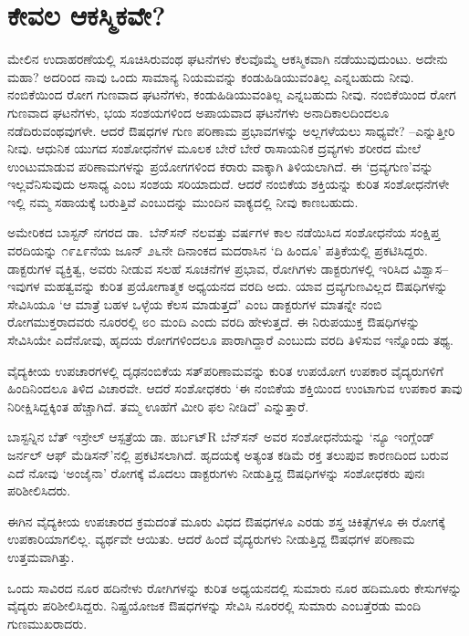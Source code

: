 \section*{ಕೇವಲ ಆಕಸ್ಮಿಕವೇ?}


ಮೇಲಿನ ಉದಾಹರಣೆಯಲ್ಲಿ ಸೂಚಿಸಿರುವಂಥ ಘಟನೆಗಳು ಕೆಲವೊಮ್ಮೆ ಆಕಸ್ಮಿಕವಾಗಿ ನಡೆಯುವುದುಂಟು. ಅದೇನು ಮಹಾ? ಅದರಿಂದ ನಾವು ಒಂದು ಸಾಮಾನ್ಯ ನಿಯಮವನ್ನು ಕಂಡು\-ಹಿಡಿಯು\-ವಂತಿಲ್ಲ ಎನ್ನಬಹುದು ನೀವು. ನಂಬಿಕೆಯಿಂದ ರೋಗ ಗುಣವಾದ ಘಟನೆಗಳು, ಕಂಡುಹಿಡಿಯುವಂತಿಲ್ಲ ಎನ್ನಬಹುದು ನೀವು. ನಂಬಿಕೆಯಿಂದ ರೋಗ ಗುಣವಾದ ಘಟನೆಗಳು, ಭಯ ಸಂಶಯಗಳಿಂದ ಅಪಾಯವಾದ ಘಟನೆಗಳು ಅನಾದಿಕಾಲದಿಂದಲೂ ನಡೆದಿರುವಂಥವುಗಳೇ. ಆದರೆ ಔಷಧಗಳ ಗುಣ ಪರಿಣಾಮ ಪ್ರಭಾವಗಳನ್ನು ಅಲ್ಲಗಳೆಯಲು ಸಾಧ್ಯವೇ? –ಎನ್ನುತ್ತೀರಿ ನೀವು. ಆಧುನಿಕ ಯುಗದ ಸಂಶೋಧನೆಗಳ ಮೂಲಕ ಬೇರೆ ಬೇರೆ ರಾಸಾಯನಿಕ ದ್ರವ್ಯಗಳು ಶರೀರದ ಮೇಲೆ ಉಂಟುಮಾಡುವ ಪರಿಣಾಮಗಳನ್ನು ಪ್ರಯೋಗಗಳಿಂದ ಕರಾರು ವಾಕ್ಕಾಗಿ ತಿಳಿಯಲಾಗಿದೆ. ಈ ‘ದ್ರವ್ಯಗುಣ’ವನ್ನು ಇಲ್ಲವೆನಿಸುವುದು ಅಸಾಧ್ಯ ಎಂಬ ಸಂಶಯ ಸರಿಯಾದುದೆ. ಆದರೆ ನಂಬಿಕೆಯ ಶಕ್ತಿಯನ್ನು ಕುರಿತ ಸಂಶೋಧನೆಗಳೇ ಇಲ್ಲಿ ನಮ್ಮ ಸಹಾಯಕ್ಕೆ ಬರುತ್ತಿವೆ ಎಂಬುದನ್ನು ಮುಂದಿನ ವಾಕ್ಯದಲ್ಲಿ ನೀವು ಕಾಣಬಹುದು.

ಅಮೇರಿಕದ ಬಾಸ್ಟನ್ ನಗರದ ಡಾ.\ ಬೆನ್​ಸನ್ ನಲವತ್ತು ವರ್ಷಗಳ ಕಾಲ ನಡೆಯಿಸಿದ ಸಂಶೋಧನೆಯ ಸಂಕ್ಷಿಪ್ತ ವರದಿಯನ್ನು ೧೯೭೯ನೆಯ ಜೂನ್ ೨೬ನೇ ದಿನಾಂಕದ ಮದರಾಸಿನ ‘ದಿ ಹಿಂದೂ’ ಪತ್ರಿಕೆಯಲ್ಲಿ ಪ್ರಕಟಿಸಿದ್ದರು. ಡಾಕ್ಟರುಗಳ ವ್ಯಕ್ತಿತ್ವ, ಅವರು ನೀಡುವ ಸಲಹೆ ಸೂಚನೆಗಳ ಪ್ರಭಾವ, ರೋಗಿಗಳು ಡಾಕ್ಟರುಗಳಲ್ಲಿ ಇರಿಸಿದ ವಿಶ್ವಾಸ–ಇವುಗಳ ಮಹತ್ವವನ್ನು ಕುರಿತ ಪ್ರಯೋಗಾತ್ಮಕ ಅಧ್ಯಯನದ ವರದಿ ಅದು. ಯಾವ ದ್ರವ್ಯಗುಣವಿಲ್ಲದ ಔಷಧಿಗಳನ್ನು ಸೇವಿಸಿಯೂ ‘ಆ ಮಾತ್ರೆ ಬಹಳ ಒಳ್ಳೆಯ ಕೆಲಸ ಮಾಡುತ್ತದೆ’ ಎಂಬ ಡಾಕ್ಟರುಗಳ ಮಾತನ್ನೇ ನಂಬಿ ರೋಗಮುಕ್ತರಾದವರು ನೂರರಲ್ಲಿ ೮೦ ಮಂದಿ ಎಂದು ವರದಿ ಹೇಳುತ್ತದೆ. ಈ ನಿರುಪಯುಕ್ತ ಔಷಧಿಗಳನ್ನು ಸೇವಿಸಿಯೇ ಎದೆನೋವು, ಹೃದಯ ರೋಗಗಳಿಂದಲೂ ಪಾರಾಗಿದ್ದಾರೆ ಎಂಬುದು ವರದಿ ತಿಳಿಸುವ ಇನ್ನೊಂದು ತಥ್ಯ.

ವೈದ್ಯಕೀಯ ಉಪಚಾರಗಳಲ್ಲಿ ದೃಢನಂಬಿಕೆಯ ಸತ್​ಪರಿಣಾಮವನ್ನು ಕುರಿತ ಉಪಯೋಗ ಉಪಕಾರ ವೈದ್ಯರುಗಳಿಗೆ ಹಿಂದಿನಿಂದಲೂ ತಿಳಿದ ವಿಚಾರವೇ. ಆದರೆ ಸಂಶೋಧಕರು ‘ಈ ನಂಬಿಕೆಯ ಶಕ್ತಿಯಿಂದ ಉಂಟಾಗುವ ಉಪಕಾರ ತಾವು ನಿರೀಕ್ಷಿಸಿದ್ದಕ್ಕಿಂತ ಹೆಚ್ಚಾಗಿದೆ. ತಮ್ಮ ಊಹೆಗೆ ಮೀರಿ ಫಲ ನೀಡಿದೆ’ ಎನ್ನುತ್ತಾರೆ.

ಬಾಸ್ಟನ್ನಿನ ಬೆತ್ ಇಸ್ರೇಲ್ ಆಸ್ಪತ್ರೆಯ ಡಾ. ಹರ್ಬಟ್R ಬೆನ್​ಸನ್ ಅವರ ಸಂಶೋಧನೆಯನ್ನು ‘ನ್ಯೂ ಇಂಗ್ಲೆಂಡ್ ಜರ್ನಲ್ ಆಫ್ ಮೆಡಿಸನ್​’ನಲ್ಲಿ ಪ್ರಕಟಿಸಲಾಗಿದೆ. ಹೃದಯಕ್ಕೆ ಅತ್ಯಂತ ಕಡಿಮೆ ರಕ್ತ ತಲುಪುವ ಕಾರಣದಿಂದ ಬರುವ ಎದೆ ನೋವು ‘ಅಂಜೈನಾ’ ರೋಗಕ್ಕೆ ಮೊದಲು ಡಾಕ್ಟರುಗಳು ನೀಡುತ್ತಿದ್ದ ಔಷಧಿಗಳನ್ನು ಸಂಶೋಧಕರು ಪುನಃ ಪರಿಶೀಲಿಸಿದರು.

\newpage

ಈಗಿನ ವೈದ್ಯಕೀಯ ಉಪಚಾರದ ಕ್ರಮದಂತೆ ಮೂರು ವಿಧದ ಔಷಧಗಳೂ ಎರಡು ಶಸ್ತ್ರ ಚಿಕಿತ್ಸೆಗಳೂ ಈ ರೋಗಕ್ಕೆ ಉಪಕಾರಿಯಾಗಲಿಲ್ಲ. ವ್ಯರ್ಥವೇ ಆಯಿತು. ಆದರೆ ಹಿಂದೆ ವೈದ್ಯರುಗಳು ನೀಡುತ್ತಿದ್ದ ಔಷಧಗಳ ಪರಿಣಾಮ ಉತ್ತಮವಾಗಿತ್ತು.

ಒಂದು ಸಾವಿರದ ನೂರ ಹದಿನೇಳು ರೋಗಿಗಳನ್ನು ಕುರಿತ ಅಧ್ಯಯನದಲ್ಲಿ ಸುಮಾರು ನೂರ ಹದಿಮೂರು ಕೇಸುಗಳನ್ನು ವೈದ್ಯರು ಪರಿಶೀಲಿಸಿದ್ದರು. ನಿಷ್ಪ್ರಯೋಜಕ ಔಷಧಗಳನ್ನು ಸೇವಿಸಿ ನೂರರಲ್ಲಿ ಸುಮಾರು ಎಂಬತ್ತೆರಡು ಮಂದಿ ಗುಣಮುಖರಾದರು.

